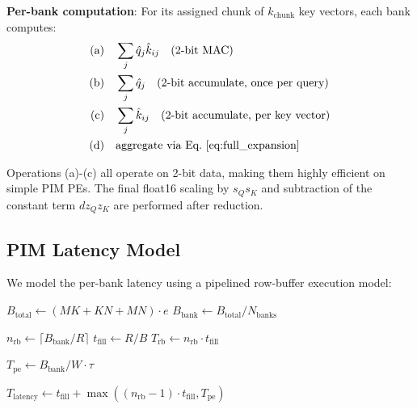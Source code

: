 \textbf{Per-bank computation}: For its assigned chunk of $k_{\text{chunk}}$ key vectors, each bank computes:
\begin{equation}
\begin{aligned}
\text{(a)} &\quad \sum_{j} \hat{q}_j \hat{k}_{ij} \quad \text{(2-bit MAC)} \\
\text{(b)} &\quad \sum_{j} \hat{q}_j \quad \text{(2-bit accumulate, once per query)} \\
\text{(c)} &\quad \sum_{j} \hat{k}_{ij} \quad \text{(2-bit accumulate, per key vector)} \\
\text{(d)} &\quad \text{aggregate via Eq.~\ref{eq:full_expansion}}
\end{aligned}
\end{equation}

Operations (a)-(c) all operate on 2-bit data, making them highly efficient on simple PIM PEs.
The final float16 scaling by $s_Q s_K$ and subtraction of the constant term $d z_Q z_K$ are performed after reduction.

\subsection{PIM Latency Model}

We model the per-bank latency using a pipelined row-buffer execution model:

\begin{algorithm}[t]
\caption{Per-Bank PIM GEMV Latency}
\label{alg:pim}
\SetAlgoLined
{}

$B_{\text{total}} \gets (MK + KN + MN) \cdot e$ 
$B_{\text{bank}} \gets B_{\text{total}} / N_{\text{banks}}$

$n_{\text{rb}} \gets \lceil B_{\text{bank}} / R \rceil$ 
$t_{\text{fill}} \gets R / B$ 
$T_{\text{rb}} \gets n_{\text{rb}} \cdot t_{\text{fill}}$

$T_{\text{pe}} \gets B_{\text{bank}} / W \cdot \tau$ 


$T_{\text{latency}} \gets t_{\text{fill}} + \max((n_{\text{rb}}-1) \cdot t_{\text{fill}}, T_{\text{pe}})$
\end{algorithm}

